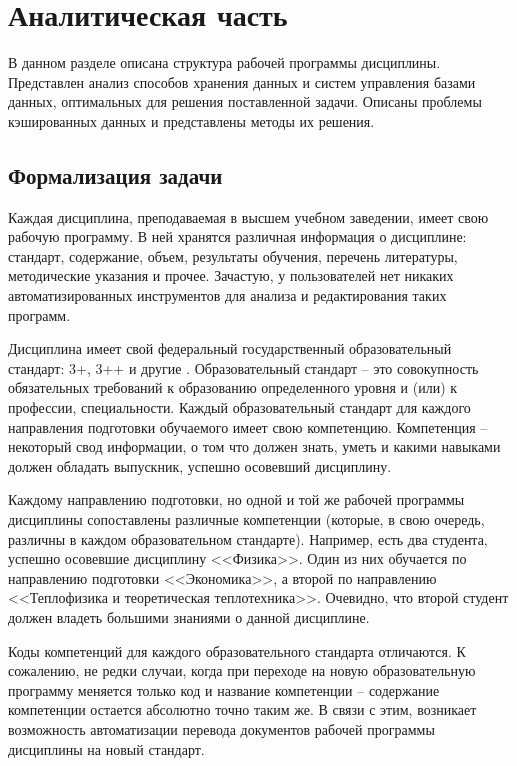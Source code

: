 \chapter{Аналитическая часть}

В данном разделе описана структура рабочей программы дисциплины. Представлен анализ способов хранения данных и систем управления базами данных, оптимальных для решения поставленной задачи. Описаны проблемы кэшированных данных и представлены методы их решения.

\section{Формализация задачи}

Каждая дисциплина, преподаваемая в высшем учебном заведении, имеет свою рабочую программу. В ней хранятся различная информация о дисциплине: стандарт, содержание, объем, результаты обучения, перечень литературы, методические указания и прочее. Зачастую, у пользователей нет никаких автоматизированных инструментов для анализа и редактирования таких программ.

Дисциплина имеет свой федеральный государственный образовательный стандарт: 3+, 3++ и другие \cite{standard}. Образовательный стандарт -- это совокупность обязательных требований к образованию определенного уровня и (или) к профессии, специальности. Каждый образовательный стандарт для каждого направления подготовки обучаемого имеет свою компетенцию. Компетенция -- некоторый свод информации, о том что должен знать, уметь и какими навыками должен обладать выпускник, успешно осовевший дисциплину. 

Каждому направлению подготовки, но одной и той же рабочей программы дисциплины сопоставлены различные компетенции (которые, в свою очередь, различны в каждом образовательном стандарте). Например, есть два студента, успешно осовевшие дисциплину <<Физика>>. Один из них обучается по направлению подготовки <<Экономика>>, а второй по направлению <<Теплофизика и теоретическая теплотехника>>. Очевидно, что второй студент должен владеть большими знаниями о данной дисциплине.

Коды компетенций для каждого образовательного стандарта отличаются. К сожалению, не редки случаи, когда при переходе на новую образовательную программу меняется только код и название компетенции -- содержание компетенции остается абсолютно точно таким же. В связи с этим, возникает возможность автоматизации перевода документов рабочей программы дисциплины на новый стандарт.


